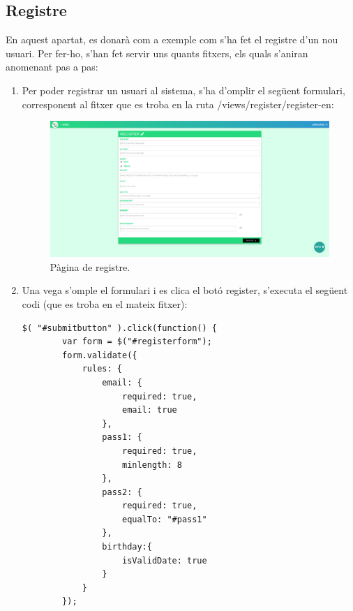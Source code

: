 \documentclass[11pt,catalan,listoffigures,listoftables]{tfgetsinf}
\begin{document}
\subsection{Registre}
En aquest apartat, es donarà com a exemple com s'ha fet el registre d'un nou usuari. Per fer-ho, s'han fet servir uns quants fitxers, els quals s'aniran anomenant pas a pas:

\begin{enumerate}
	\item Per poder registrar un usuari al sistema, s'ha d'omplir el següent formulari, corresponent al fitxer que es troba en la ruta /views/register/register-en:
\begin{figure}[h]
\includegraphics[width=15cm]{images/image13}
\centering
\caption[Figura 4.8]{Pàgina de registre.}
\centering
\end{figure}
\item Una vega s'omple el formulari i es clica el botó register, s'executa el següent codi (que es troba en el mateix fitxer):
\begin{lstlisting}
$( "#submitbutton" ).click(function() {
        var form = $("#registerform");
        form.validate({
            rules: {
                email: {
                    required: true,
                    email: true
                },
                pass1: {
                    required: true,
                    minlength: 8
                },
                pass2: {
                    required: true,
                    equalTo: "#pass1"
                },
                birthday:{
                    isValidDate: true
                }
            }
        });


\end{lstlisting}
\end{enumerate}
\end{document}

